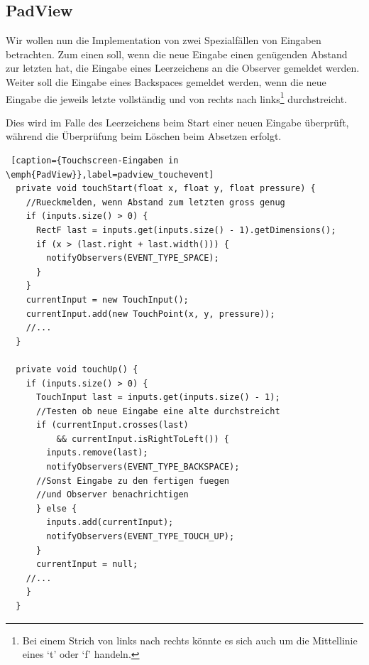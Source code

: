 \subsection{PadView}

Wir wollen nun die Implementation von zwei Spezialfällen von Eingaben betrachten. Zum einen soll, wenn die neue Eingabe einen genügenden Abstand zur letzten hat, die Eingabe eines Leerzeichens an die Observer gemeldet werden. Weiter soll die Eingabe eines Backspaces gemeldet werden, wenn die neue Eingabe die jeweils letzte vollständig und von rechts nach links\footnote{Bei einem Strich von links nach rechts könnte es sich auch um die Mittellinie eines `t' oder `f' handeln.} durchstreicht.

Dies wird im Falle des Leerzeichens beim Start einer neuen Eingabe überprüft, während die Überprüfung beim Löschen beim Absetzen erfolgt.

\begin{lstlisting} [caption={Touchscreen-Eingaben in \emph{PadView}},label=padview_touchevent]
  private void touchStart(float x, float y, float pressure) {
    //Rueckmelden, wenn Abstand zum letzten gross genug
    if (inputs.size() > 0) {
      RectF last = inputs.get(inputs.size() - 1).getDimensions();
      if (x > (last.right + last.width())) {
        notifyObservers(EVENT_TYPE_SPACE);
      }
    }
    currentInput = new TouchInput();
    currentInput.add(new TouchPoint(x, y, pressure));
    //...
  }

  private void touchUp() {
    if (inputs.size() > 0) {
      TouchInput last = inputs.get(inputs.size() - 1);
      //Testen ob neue Eingabe eine alte durchstreicht
      if (currentInput.crosses(last) 
          && currentInput.isRightToLeft()) {
        inputs.remove(last);
        notifyObservers(EVENT_TYPE_BACKSPACE);
      //Sonst Eingabe zu den fertigen fuegen 
      //und Observer benachrichtigen
      } else {
        inputs.add(currentInput);
        notifyObservers(EVENT_TYPE_TOUCH_UP);
      }
      currentInput = null;
    //...
    }
  }
\end{lstlisting}

